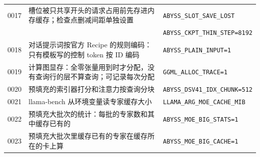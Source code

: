 \documentclass[11pt,a4paper]{article}
\newcommand{\code}[1]{\texttt{#1}}
\begin{document}
\begin{table}[h]
\begin{tabularx}{\textwidth}{@{}l X l@{}}
    0017 & 槽位被只共享开头的请求占用前先存进内存缓存；检查点删减间距单独设置 & \code{ABYSS\_SLOT\_SAVE\_LOST} \\
         & & \code{ABYSS\_CKPT\_THIN\_STEP=8192} \\
    0018 & 对话提示词按官方 Recipe 的规则编码：只有模板写的控制 token 按 ID 编码 & \code{ABYSS\_PLAIN\_INPUT=1} \\
    0019 & 计算图显存：全零张量用到时才分配，没有查询行的层不算查询；可记录每次分配 & \code{GGML\_ALLOC\_TRACE=1} \\
    0020 & 预填充的索引器打分和注意力按查询分块 & \code{ABYSS\_DSV41\_IDX\_CHUNK=512} \\
    0021 & llama-bench 从环境变量读专家缓存大小 & \code{LLAMA\_ARG\_MOE\_CACHE\_MIB} \\
    0022 & 预填充大批次的统计：每批的专家数和其中缓存已有的 & \code{ABYSS\_MOE\_BIG\_STATS=1} \\
    0023 & 预填充大批次里缓存已有的专家在缓存所在的卡上算 & \code{ABYSS\_MOE\_BIG\_CACHE=1} \\
    \bottomrule
  \end{tabularx}
\end{table}
\end{document}
